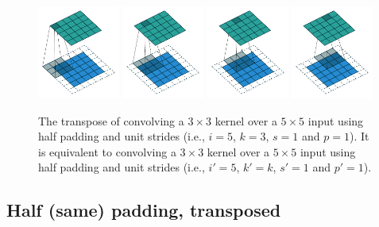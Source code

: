 \begin{figure}[p]
    \centering
    \includegraphics[width=0.24\textwidth]{pdf/same_padding_no_strides_transposed_00.pdf}
    \includegraphics[width=0.24\textwidth]{pdf/same_padding_no_strides_transposed_01.pdf}
    \includegraphics[width=0.24\textwidth]{pdf/same_padding_no_strides_transposed_02.pdf}
    \includegraphics[width=0.24\textwidth]{pdf/same_padding_no_strides_transposed_03.pdf}
    \caption{\label{fig:same_padding_no_strides_transposed} The transpose of
        convolving a $3 \times 3$ kernel over a $5 \times 5$ input using half
        padding and unit strides (i.e., $i = 5$, $k = 3$, $s = 1$ and $p = 1$).
        It is equivalent to convolving a $3 \times 3$ kernel over a $5 \times 5$
        input using half padding and unit strides (i.e., $i' = 5$, $k' = k$, $s'
        = 1$ and $p' = 1$).}
\end{figure}

\subsection{Half (same) padding, transposed}

